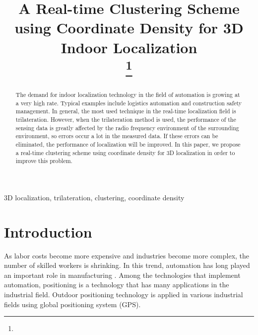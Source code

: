\documentclass[conference]{IEEEtran}
\begin{document}
\title{A Real-time Clustering Scheme using Coordinate Density for 3D Indoor Localization\\
    \thanks{}}

\author{
    \and
}

\maketitle

\begin{abstract}
    The demand for indoor localization technology in the field of automation is growing at a very high rate. Typical examples include logistics automation and construction safety management. In general, the most used technique in the real-time localization field is trilateration. However, when the trilateration method is used, the performance of the sensing data is greatly affected by the radio frequency environment of the surrounding environment, so errors occur a lot in the measured data. If these errors can be eliminated, the performance of localization will be improved. In this paper, we propose a real-time clustering scheme using coordinate density for 3D localization in order to improve this problem.
\end{abstract}

\begin{IEEEkeywords}
    3D localization, trilateration, clustering, coordinate density
\end{IEEEkeywords}

\section{Introduction}
As labor costs become more expensive and industries become more complex, the number of skilled workers is shrinking. In this trend, automation has long played an important role in manufacturing \cite{b1}. Among the technologies that implement automation, positioning is a technology that has many applications in the industrial field. Outdoor positioning technology is applied in various industrial fields using global positioning system (GPS)\cite{b2}.
\end{document}
